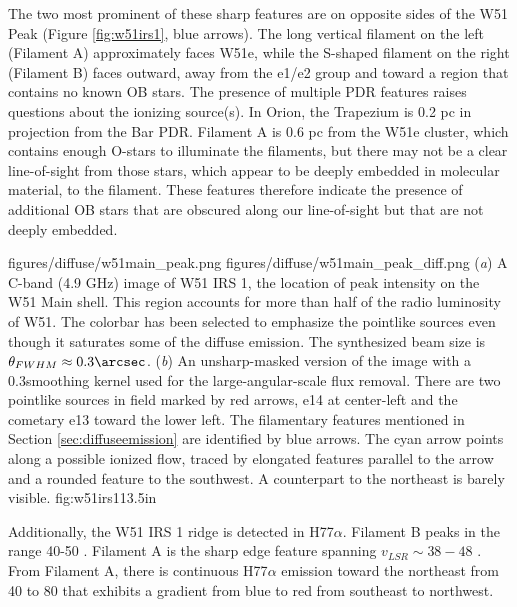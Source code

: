 The two most prominent of these sharp features are on opposite sides of the W51
Peak (Figure \ref{fig:w51irs1}, blue arrows).  The long vertical filament
on the left (Filament A) approximately faces W51e, while the S-shaped filament
on the right (Filament B) faces outward, away from the e1/e2 group and toward a
region that contains no known OB stars.  The presence of multiple PDR features
raises questions about the ionizing source(s).  In Orion, the Trapezium is 0.2
pc in projection from the Bar PDR.  Filament A is 0.6 pc from the W51e cluster,
which contains enough O-stars to illuminate the filaments, but there may not be
a clear line-of-sight from those stars, which appear to be deeply embedded in
molecular material, to the filament.  These features therefore indicate the
presence of additional OB stars that are obscured along our line-of-sight but
that are not deeply embedded.

\FigureTwo
{figures/diffuse/w51main_peak.png}
{figures/diffuse/w51main_peak_diff.png}
{({\it a}) A C-band (4.9 GHz) image of W51 IRS 1, the location of peak
intensity on the W51 Main shell.
This region accounts for more than half of the radio luminosity of W51.  The
colorbar has been selected to emphasize the pointlike sources even though it
saturates some of the diffuse emission.  The synthesized beam size
is $\theta_{FWHM}\approx0.3\arcsec$.
({\it b}) An unsharp-masked version of the image with a 0.3\arcsec smoothing
kernel used for the large-angular-scale flux removal. 
There are
two pointlike sources in field marked by red arrows, e14 at center-left and the
cometary e13 toward the lower left.
The filamentary features mentioned in Section \ref{sec:diffuseemission} are
identified by blue arrows.  The cyan arrow points along a possible ionized flow,
traced by elongated features parallel to the arrow and a rounded feature to the
southwest.  A counterpart to the northeast is barely visible.
}
{fig:w51irs1}{1}{3.5in}

Additionally, the W51 IRS 1 ridge is detected in H77$\alpha$.  Filament
B peaks in the range 40-50 \kms.  Filament A is the sharp edge feature
spanning $v_{LSR}\sim38-48$ \kms.  From Filament A, there is continuous
H77$\alpha$ emission toward the northeast from 40 to 80 \kms that exhibits a
gradient from blue to red from southeast to northwest.  

